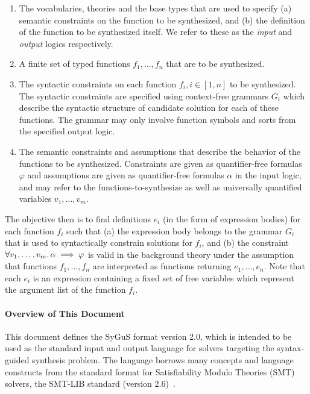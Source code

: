 \documentclass[english,a4paper,10pt]{article}
\begin{document}
\begin{enumerate}
\item
  The vocabularies, theories and the base types that are used to specify
  (a) semantic constraints on the function to be synthesized, and (b) the
  definition of the function to be synthesized itself. We refer to these as
  the \emph{input} and \emph{output} logics respectively.
\item
  A finite set of typed functions $f_1, \ldots, f_n$ that are to be synthesized.
\item
  The syntactic constraints on each function $f_i, i \in [1,n]$ to be
  synthesized. The syntactic constraints are specified using context-free
  grammars $G_i$ which describe the syntactic structure of candidate
  solution for each of these functions.
  The grammar may only involve function
  symbols and sorts from the specified output logic.
\item
  The semantic constraints and assumptions that describe the behavior of the functions to
  be synthesized. Constraints are given as quantifier-free formulas $\varphi$ 
  and assumptions are given as quantifier-free formulas $\alpha$
  in the input logic, and may refer to the functions-to-synthesize as well as 
  universally quantified variables
  $v_1, \ldots, v_m$. 
 
\end{enumerate}
The objective then is to find definitions $e_i$ (in the form of
expression bodies) for each function $f_i$ such that (a) the expression
body belongs to the grammar $G_i$ that is used to syntactically constrain
solutions for $f_i$, and 
(b) the constraint 
$\forall v_1, \ldots,
v_m \ldotp \alpha \implies \varphi$ is valid in the background theory
under the assumption that functions $f_1, \ldots, f_n$
are interpreted as functions returning $e_1, \ldots, e_n$.
Note that each $e_i$ is
an expression containing
a fixed set of free variables which
represent the argument list of the function $f_i$.


\paragraph{Overview of This Document}
This document defines the SyGuS format version 2.0,
which is intended to be used as the standard input and output language
for solvers targeting the syntax-guided synthesis problem.
The language borrows many concepts and language constructs
from the standard format for Satisfiability Modulo Theories (SMT)
solvers, the SMT-LIB standard (version 2.6)~\cite{BarFT-RR-17}.
\end{document}
